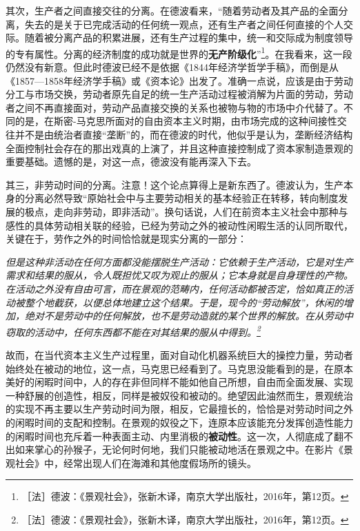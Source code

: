 \documentclass[fontset=fandol, a4paper, 12pt, openright]{ctexbook}
\renewenvironment{quote}
  {\list{}{\rightmargin\leftmargin}%
   \item\relax\small\itshape\color{darkgray}}
  {\endlist}
\begin{document}
其次，生产者之间直接交往的分离。在德波看来，“随着劳动者及其产品的全面分离，失去的是关于已完成活动的任何统一观点，还有生产者之间任何直接的个人交际。随着被分离产品的积累进展，还有生产过程的集中，统一和交际成为制度领导的专有属性。分离的经济制度的成功就是世界的\textbf{无产阶级化}”\footnote{［法］德波：《景观社会》，张新木译，南京大学出版社，2016年，第12页。}。在我看来，这一段仍然没有新意。但此时德波已经不是依据《1844年经济学哲学手稿》，而倒是从《1857—1858年经济学手稿》或《资本论》出发了。准确一点说，应该是由于劳动分工与市场交换，劳动者原先自足的统一生产活动过程被消解为片面的劳动，劳动者之间不再直接面对，劳动产品直接交换的关系也被物与物的市场中介代替了。不同的是，在斯密-马克思所面对的自由资本主义时期，由市场完成的这种间接性交往并不是由统治者直接“垄断”的，而在德波的时代，他似乎是认为，垄断经济结构全面控制社会存在的那出戏真的上演了，并且这种直接控制成了资本家制造景观的重要基础。遗憾的是，对这一点，德波没有能再深入下去。

其三，非劳动时间的分离。注意！这个论点算得上是新东西了。德波认为，生产本身的分离必然导致“原始社会中与主要劳动相关的基本经验正在转移，转向制度发展的极点，走向非劳动，即非活动”。换句话说，人们在前资本主义社会中那种与感性的具体劳动相关联的经验，已经为劳动之外的被动性闲暇生活的认同所取代，关键在于，劳作之外的时间恰恰就是现实分离的一部分：

\begin{quote}
但是这种非活动在任何方面都没能摆脱生产活动：它依赖于生产活动，它是对生产需求和结果的服从，令人既担忧又叹为观止的服从；它本身就是自身理性的产物。在活动之外没有自由可言，而在景观的范畴内，任何活动都被否定，恰如真正的活动被整个地截获，以便总体地建立这个结果。于是，现今的“劳动解放”，休闲的增加，绝对不是劳动中的任何解放，也不是劳动造就的某个世界的解放。在从劳动中窃取的活动中，任何东西都不能在对其结果的服从中得到。\footnote{［法］德波：《景观社会》，张新木译，南京大学出版社，2016年，第12页。}
\end{quote}

故而，在当代资本主义生产过程里，面对自动化机器系统巨大的操控力量，劳动者始终处在被动的地位，这一点，马克思已经看到了。马克思没能看到的是，在原本美好的闲暇时间中，人的存在非但同样不能如他自己所想，自由而全面发展、实现一种舒展的创造性，相反，同样是被奴役和被动的。绝望因此油然而生，景观统治的实现不再主要以生产劳动时间为限，相反，它最擅长的，恰恰是对劳动时间之外的闲暇时间的支配和控制。在景观的奴役之下，连原本应该能充分发挥创造性能力的闲暇时间也充斥着一种表面主动、内里消极的\textbf{被动性}。这一次，人彻底成了翻不出如来掌心的孙猴子，无论何时何地，我们只能被动地活在景观之中。{\kaishu 在影片《景观社会》中，经常出现人们在海滩和其他度假场所的镜头。}
\end{document}
